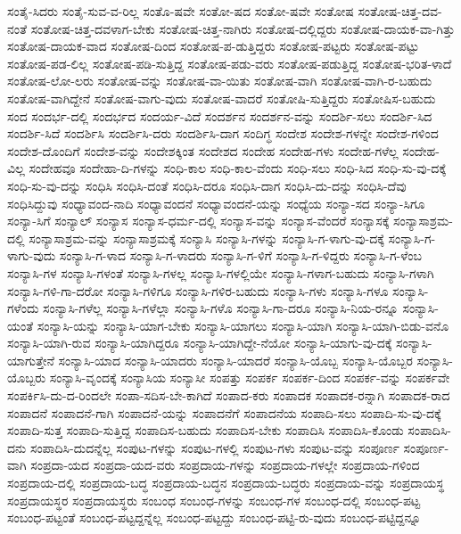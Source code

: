 {ಸಂತೈ-ಸಿದರು
ಸಂತೈ-ಸುವ-ವ-ರಿಲ್ಲ
ಸಂತೊ-ಷವೇ
ಸಂತೋ-ಷದ
ಸಂತೋ-ಷವೇ
ಸಂತೋಷ
ಸಂತೋಷ-ಚಿತ್ತ-ದವ-ನಂತೆ
ಸಂತೋಷ-ಚಿತ್ತ-ದವಳಾಗ-ಬೇಕು
ಸಂತೋಷ-ಚಿತ್ತ-ನಾಗಿರು
ಸಂತೋಷ-ದಲ್ಲಿದ್ದರು
ಸಂತೋಷ-ದಾಯಕ-ವಾ-ಗಿತ್ತು
ಸಂತೋಷ-ದಾಯಕ-ವಾದ
ಸಂತೋಷ-ದಿಂದ
ಸಂತೋಷ-ಪ-ಡುತ್ತಿದ್ದರು
ಸಂತೋಷ-ಪಟ್ಟರು
ಸಂತೋಷ-ಪಟ್ಟು
ಸಂತೋಷ-ಪಡ-ಲಿಲ್ಲ
ಸಂತೋಷ-ಪಡಿ-ಸುತ್ತಿದ್ದ
ಸಂತೋಷ-ಪಡು-ವರು
ಸಂತೋಷ-ಪಡುತ್ತಿದ್ದ
ಸಂತೋಷ-ಭರಿತ-ಳಾದೆ
ಸಂತೋಷ-ಲೋ-ಲರು
ಸಂತೋಷ-ವನ್ನು
ಸಂತೋಷ-ವಾ-ಯಿತು
ಸಂತೋಷ-ವಾಗಿ
ಸಂತೋಷ-ವಾಗಿ-ರ-ಬಹುದು
ಸಂತೋಷ-ವಾಗಿದ್ದೇನೆ
ಸಂತೋಷ-ವಾಗು-ವುದು
ಸಂತೋಷ-ವಾದರೆ
ಸಂತೋಷಿ-ಸುತ್ತಿದ್ದರು
ಸಂತೋಷಿಸ-ಬಹುದು
ಸಂದ
ಸಂದರ್ಭ-ದಲ್ಲಿ
ಸಂದರ್ಭದ
ಸಂದರ್ಯ-ವಿದೆ
ಸಂದರ್ಶನ
ಸಂದರ್ಶನ-ವನ್ನು
ಸಂದರ್ಶಿ-ಸಲು
ಸಂದರ್ಶಿ-ಸಿದ
ಸಂದರ್ಶಿ-ಸಿದೆ
ಸಂದರ್ಶಿಸಿ
ಸಂದರ್ಶಿಸಿ-ದರು
ಸಂದರ್ಶಿಸಿ-ದಾಗ
ಸಂದಿಗ್ಧ
ಸಂದೇಶ
ಸಂದೇಶ-ಗಳನ್ನೇ
ಸಂದೇಶ-ಗಳಿಂದ
ಸಂದೇಶ-ದೊಂದಿಗೆ
ಸಂದೇಶ-ವನ್ನು
ಸಂದೇಶಕ್ಕಿಂತ
ಸಂದೇಶದ
ಸಂದೇಹ
ಸಂದೇಹ-ಗಳು
ಸಂದೇಹ-ಗಳೆಲ್ಲ
ಸಂದೇಹ-ವಿಲ್ಲ
ಸಂದೇಹವೂ
ಸಂದೇಹಾ-ದಿ-ಗಳನ್ನು
ಸಂಧಿ-ಕಾಲ
ಸಂಧಿ-ಕಾಲ-ವೆಂದು
ಸಂಧಿ-ಸಲು
ಸಂಧಿ-ಸಿದ
ಸಂಧಿ-ಸು-ವು-ದಕ್ಕೆ
ಸಂಧಿ-ಸು-ವು-ದನ್ನು
ಸಂಧಿಸಿ
ಸಂಧಿಸಿ-ದಂತೆ
ಸಂಧಿಸಿ-ದರೂ
ಸಂಧಿಸಿ-ದಾಗ
ಸಂಧಿಸಿ-ದು-ದನ್ನು
ಸಂಧಿಸಿ-ದೆವು
ಸಂಧಿಸಿದ್ದುವು
ಸಂಧ್ಯಾವಂದ-ನಾದಿ
ಸಂಧ್ಯಾವಂದನೆ
ಸಂಧ್ಯಾವಂದನೆ-ಯನ್ನು
ಸಂಧ್ಯೆಯ
ಸಂನ್ಯಾ-ಸದ
ಸಂನ್ಯಾ-ಸಿಗೂ
ಸಂನ್ಯಾ-ಸಿಗೆ
ಸಂನ್ಯಾಲ್
ಸಂನ್ಯಾಸ
ಸಂನ್ಯಾಸ-ಧರ್ಮ-ದಲ್ಲಿ
ಸಂನ್ಯಾಸ-ವನ್ನು
ಸಂನ್ಯಾಸ-ವೆಂದರೆ
ಸಂನ್ಯಾಸಕ್ಕೆ
ಸಂನ್ಯಾಸಾಶ್ರಮ-ದಲ್ಲಿ
ಸಂನ್ಯಾಸಾಶ್ರಮ-ವನ್ನು
ಸಂನ್ಯಾಸಾಶ್ರಮಕ್ಕೆ
ಸಂನ್ಯಾಸಿ
ಸಂನ್ಯಾಸಿ-ಗಳನ್ನು
ಸಂನ್ಯಾಸಿ-ಗ-ಳಾಗು-ವು-ದಕ್ಕೆ
ಸಂನ್ಯಾಸಿ-ಗ-ಳಾಗು-ವುದು
ಸಂನ್ಯಾಸಿ-ಗ-ಳಾದ
ಸಂನ್ಯಾಸಿ-ಗ-ಳಾದರು
ಸಂನ್ಯಾಸಿ-ಗ-ಳಿಗೆ
ಸಂನ್ಯಾಸಿ-ಗ-ಳಿದ್ದರು
ಸಂನ್ಯಾಸಿ-ಗ-ಳೆಂಬ
ಸಂನ್ಯಾಸಿ-ಗಳ
ಸಂನ್ಯಾಸಿ-ಗಳಂತೆ
ಸಂನ್ಯಾಸಿ-ಗಳಲ್ಲ
ಸಂನ್ಯಾಸಿ-ಗಳಲ್ಲಿಯೇ
ಸಂನ್ಯಾಸಿ-ಗಳಾಗ-ಬಹುದು
ಸಂನ್ಯಾಸಿ-ಗಳಾಗಿ
ಸಂನ್ಯಾಸಿ-ಗಳಿ-ಗಾ-ದರೋ
ಸಂನ್ಯಾಸಿ-ಗಳಿಗೂ
ಸಂನ್ಯಾಸಿ-ಗಳಿರ-ಬಹುದು
ಸಂನ್ಯಾಸಿ-ಗಳು
ಸಂನ್ಯಾಸಿ-ಗಳೂ
ಸಂನ್ಯಾಸಿ-ಗಳೆಂದು
ಸಂನ್ಯಾಸಿ-ಗಳೆಲ್ಲ
ಸಂನ್ಯಾಸಿ-ಗಳೆಲ್ಲಾ
ಸಂನ್ಯಾಸಿ-ಗಳೊ
ಸಂನ್ಯಾಸಿ-ಗಾ-ದರೂ
ಸಂನ್ಯಾಸಿ-ನಿಯ-ರನ್ನೂ
ಸಂನ್ಯಾಸಿ-ಯಂತೆ
ಸಂನ್ಯಾಸಿ-ಯನ್ನು
ಸಂನ್ಯಾಸಿ-ಯಾಗ-ಬೇಕು
ಸಂನ್ಯಾಸಿ-ಯಾಗಲು
ಸಂನ್ಯಾಸಿ-ಯಾಗಿ
ಸಂನ್ಯಾಸಿ-ಯಾಗಿ-ಬಿಡು-ವನೊ
ಸಂನ್ಯಾಸಿ-ಯಾಗಿ-ರುವ
ಸಂನ್ಯಾಸಿ-ಯಾಗಿದ್ದರೂ
ಸಂನ್ಯಾಸಿ-ಯಾಗಿದ್ದೇ-ನೆಯೋ
ಸಂನ್ಯಾಸಿ-ಯಾಗು-ವು-ದಕ್ಕೆ
ಸಂನ್ಯಾಸಿ-ಯಾಗುತ್ತೇನೆ
ಸಂನ್ಯಾಸಿ-ಯಾದ
ಸಂನ್ಯಾಸಿ-ಯಾದರು
ಸಂನ್ಯಾಸಿ-ಯಾದರೆ
ಸಂನ್ಯಾಸಿ-ಯೊಬ್ಬ
ಸಂನ್ಯಾಸಿ-ಯೊಬ್ಬರ
ಸಂನ್ಯಾಸಿ-ಯೊಬ್ಬರು
ಸಂನ್ಯಾಸಿ-ವೃಂದಕ್ಕೆ
ಸಂನ್ಯಾಸಿಯ
ಸಂನ್ಯಾಸೀ
ಸಂಪತ್ತು
ಸಂಪರ್ಕ
ಸಂಪರ್ಕ-ದಿಂದ
ಸಂಪರ್ಕ-ವನ್ನು
ಸಂಪರ್ಕವೇ
ಸಂಪರ್ಕಿಸಿ-ದು-ದ-ರಿಂದಲೇ
ಸಂಪಾ-ಸದಿಸ-ಬೇ-ಕಾಗಿದೆ
ಸಂಪಾದ-ಕರು
ಸಂಪಾದಕ
ಸಂಪಾದಕ-ರನ್ನಾಗಿ
ಸಂಪಾದಕ-ರಾದ
ಸಂಪಾದನೆ
ಸಂಪಾದನೆ-ಗಾಗಿ
ಸಂಪಾದನೆ-ಯನ್ನು
ಸಂಪಾದನೆಗೆ
ಸಂಪಾದನೆಯ
ಸಂಪಾದಿ-ಸಲು
ಸಂಪಾದಿ-ಸು-ವು-ದಕ್ಕೆ
ಸಂಪಾದಿ-ಸುತ್ತ
ಸಂಪಾದಿ-ಸುತ್ತಿದ್ದ
ಸಂಪಾದಿಸ-ಬಹುದು
ಸಂಪಾದಿಸ-ಬೇಕು
ಸಂಪಾದಿಸಿ
ಸಂಪಾದಿಸಿ-ಕೊಂಡು
ಸಂಪಾದಿಸಿ-ದನು
ಸಂಪಾದಿಸಿ-ದುದನ್ನೆಲ್ಲ
ಸಂಪುಟ-ಗಳನ್ನು
ಸಂಪುಟ-ಗಳಲ್ಲಿ
ಸಂಪುಟ-ಗಳು
ಸಂಪುಟ-ವನ್ನು
ಸಂಪೂರ್ಣ
ಸಂಪೂರ್ಣ-ವಾಗಿ
ಸಂಪ್ರದಾ-ಯದ
ಸಂಪ್ರದಾ-ಯದ-ವರು
ಸಂಪ್ರದಾಯ-ಗಳನ್ನು
ಸಂಪ್ರದಾಯ-ಗಳಲ್ಲೇ
ಸಂಪ್ರದಾಯ-ಗಳಿಂದ
ಸಂಪ್ರದಾಯ-ದಲ್ಲಿ
ಸಂಪ್ರದಾಯ-ಬದ್ಧ
ಸಂಪ್ರದಾಯ-ಬದ್ಧನ
ಸಂಪ್ರದಾಯ-ಬದ್ಧರು
ಸಂಪ್ರದಾಯ-ವನ್ನು
ಸಂಪ್ರದಾಯಸ್ಥ
ಸಂಪ್ರದಾಯಸ್ಥರ
ಸಂಪ್ರದಾಯಸ್ಥರು
ಸಂಬಂಧ
ಸಂಬಂಧ-ಗಳನ್ನು
ಸಂಬಂಧ-ಗಳ
ಸಂಬಂಧ-ದಲ್ಲಿ
ಸಂಬಂಧ-ಪಟ್ಟ
ಸಂಬಂಧ-ಪಟ್ಟಂತೆ
ಸಂಬಂಧ-ಪಟ್ಟದ್ದನ್ನೆಲ್ಲ
ಸಂಬಂಧ-ಪಟ್ಟದ್ದು
ಸಂಬಂಧ-ಪಟ್ಟಿ-ರು-ವುದು
ಸಂಬಂಧ-ಪಟ್ಟಿದ್ದನ್ನೂ
}

